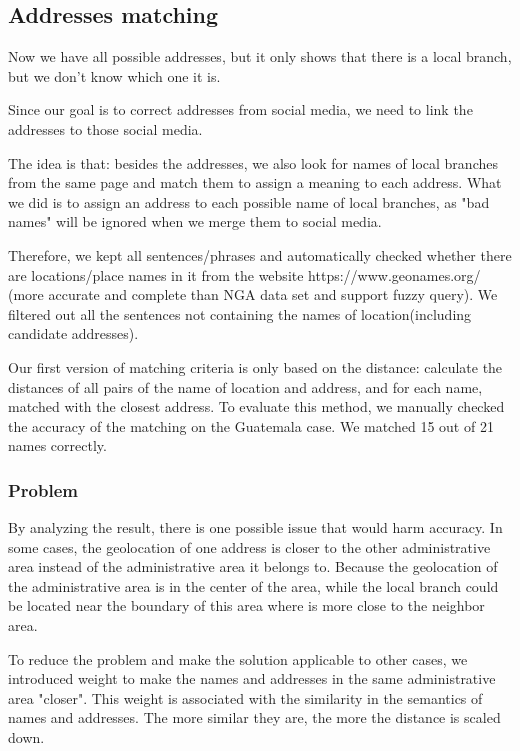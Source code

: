 \documentclass[sigchi]{acmart}
\begin{document}
\subsection{Addresses matching}

Now we have all possible addresses, but it only shows that there is a local branch, but we don't know which one it is.

Since our goal is to correct addresses from social media, we need to link the addresses to those social media.

The idea is that: besides the addresses, we also look for names of local branches from the same page and match them to assign a meaning to each address. What we did is to assign an address to each possible name of local branches, as "bad names" will be ignored when we merge them to social media.

Therefore, we kept all sentences/phrases and automatically checked whether there are locations/place names in it from the website https://www.geonames.org/ (more accurate and complete than NGA data set and support fuzzy query). We filtered out all the sentences not containing the names of location(including candidate addresses).

Our first version of matching criteria is only based on the distance: calculate the distances of all pairs of the name of location and address, and for each name, matched with the closest address. To evaluate this method, we manually checked the accuracy of the matching on the Guatemala case. We matched 15 out of 21 names correctly.

\subsubsection{Problem}
By analyzing the result, there is one possible issue that would harm accuracy. In some cases, the geolocation of one address is closer to the other administrative area instead of the administrative area it belongs to. Because the geolocation of the administrative area is in the center of the area, while the local branch could be located near the boundary of this area where is more close to the neighbor area.

To reduce the problem and make the solution applicable to other cases, we introduced weight to make the names and addresses in the same administrative area "closer". This weight is associated with the similarity in the semantics of names and addresses. The more similar they are, the more the distance is scaled down.
\end{document}

